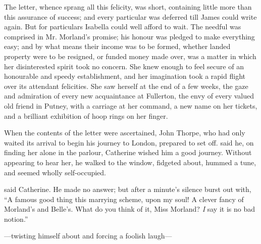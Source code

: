 The letter, whence sprang all this felicity, was short, containing little more than this assurance of success; and every particular was deferred till James could write again. But for particulars Isabella could well afford to wait. The needful was comprised in Mr. Morland's promise; his honour was pledged to make everything easy; and by what means their income was to be formed, whether landed property were to be resigned, or funded money made over, was a matter in which her disinterested spirit took no concern. She knew enough to feel secure of an honourable and speedy establishment, and her imagination took a rapid flight over its attendant felicities. She saw herself at the end of a few weeks, the gaze and admiration of every new acquaintance at Fullerton, the envy of every valued old friend in Putney, with a carriage at her command, a new name on her tickets, and a brilliant exhibition of hoop rings on her finger.

When the contents of the letter were ascertained, John Thorpe, who had only waited its arrival to begin his journey to London, prepared to set off.  said he, on finding her alone in the parlour,  Catherine wished him a good journey. Without appearing to hear her, he walked to the window, fidgeted about, hummed a tune, and seemed wholly self-occupied.

 said Catherine. He made no answer; but after a minute's silence burst out with, “A famous good thing this marrying scheme, upon my soul! A clever fancy of Morland's and Belle's. What do you think of it, Miss Morland? {\em I} say it is no bad notion.”




---twisting himself about and forcing a foolish laugh---


